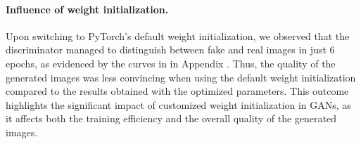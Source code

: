 \paragraph*{Influence of weight initialization.}
Upon switching to PyTorch's default weight initialization, we observed that the discriminator managed to distinguish between fake and real images in just 6 epochs, as evidenced by the curves in  in Appendix . Thus, the quality of the generated images was less convincing when using the default weight initialization compared to the results obtained with the optimized parameters. This outcome highlights the significant impact of customized weight initialization in GANs, as it affects both the training efficiency and the overall quality of the generated images.

\begin{figure}[H]
    \centering


\end{figure}
